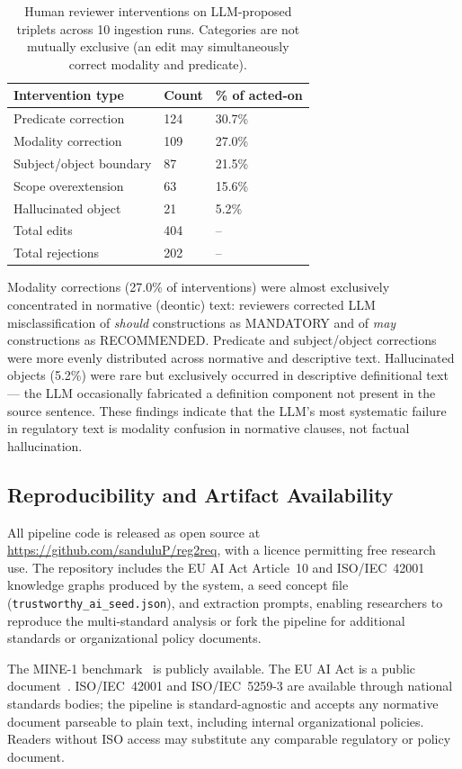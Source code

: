 \begin{table}[t]
\centering
\caption{Human reviewer interventions on LLM-proposed triplets across 10 ingestion runs. Categories are not mutually exclusive (an edit may simultaneously correct modality and predicate).}
\label{tab:hitl}
\begin{tabularx}{\columnwidth}{lXX}
\toprule
\textbf{Intervention type} & \textbf{Count} & \textbf{\% of acted-on} \\
\midrule
Predicate correction        & 124 & 30.7\% \\
Modality correction         & 109 & 27.0\% \\
Subject/object boundary     & 87  & 21.5\% \\
Scope overextension         & 63  & 15.6\% \\
Hallucinated object         & 21  & 5.2\%  \\
\midrule
Total edits                 & 404 & --     \\
Total rejections            & 202 & --     \\
\bottomrule
\end{tabularx}
\end{table}

Modality corrections (27.0\% of interventions) were almost exclusively concentrated in normative (deontic) text: reviewers corrected LLM misclassification of \emph{should} constructions as MANDATORY and of \emph{may} constructions as RECOMMENDED. Predicate and subject/object corrections were more evenly distributed across normative and descriptive text. Hallucinated objects (5.2\%) were rare but exclusively occurred in descriptive definitional text — the LLM occasionally fabricated a definition component not present in the source sentence. These findings indicate that the LLM's most systematic failure in regulatory text is modality confusion in normative clauses, not factual hallucination.

\subsection*{Reproducibility and Artifact Availability}

All pipeline code is released as open source at \url{https://github.com/sanduluP/reg2req}, with a licence permitting free research use. The repository includes the EU AI Act Article~10 and ISO/IEC~42001 knowledge graphs produced by the system, a seed concept file (\texttt{trustworthy\_ai\_seed.json}), and extraction prompts, enabling researchers to reproduce the multi-standard analysis or fork the pipeline for additional standards or organizational policy documents.

The MINE-1 benchmark~\citep{mo2025kggen} is publicly available. The EU AI Act is a public document~\citep{euAIAct2024}. ISO/IEC~42001 and ISO/IEC~5259-3 are available through national standards bodies; the pipeline is standard-agnostic and accepts any normative document parseable to plain text, including internal organizational policies. Readers without ISO access may substitute any comparable regulatory or policy document.
